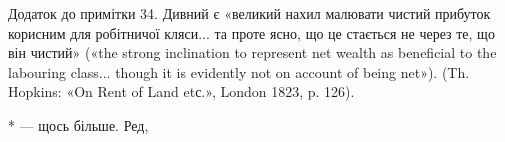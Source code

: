 Додаток до примітки 34. Дивний є «великий нахил малювати чистий прибуток корисним для робітничої
кляси... та проте ясно, що це стається не через те, що він чистий» («the strong inclination to
represent net wealth as beneficial to the labouring class... though it is evidently not on account
of being net»). (Th. Hopkins: «On Rent of Land etс.», London 1823, p. 126).

* — щось більше. Ред,

